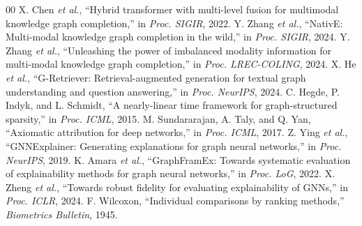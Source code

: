 \begin{thebibliography}{00}
 X. Chen \textit{et al.}, ``Hybrid transformer with multi-level fusion for multimodal knowledge graph completion,'' in \textit{Proc. SIGIR}, 2022.
 Y. Zhang \textit{et al.}, ``NativE: Multi-modal knowledge graph completion in the wild,'' in \textit{Proc. SIGIR}, 2024.
 Y. Zhang \textit{et al.}, ``Unleashing the power of imbalanced modality information for multi-modal knowledge graph completion,'' in \textit{Proc. LREC-COLING}, 2024.
 X. He \textit{et al.}, ``G-Retriever: Retrieval-augmented generation for textual graph understanding and question answering,'' in \textit{Proc. NeurIPS}, 2024.
 C. Hegde, P. Indyk, and L. Schmidt, ``A nearly-linear time framework for graph-structured sparsity,'' in \textit{Proc. ICML}, 2015.
 M. Sundararajan, A. Taly, and Q. Yan, ``Axiomatic attribution for deep networks,'' in \textit{Proc. ICML}, 2017.
 Z. Ying \textit{et al.}, ``GNNExplainer: Generating explanations for graph neural networks,'' in \textit{Proc. NeurIPS}, 2019.
 K. Amara \textit{et al.}, ``GraphFramEx: Towards systematic evaluation of explainability methods for graph neural networks,'' in \textit{Proc. LoG}, 2022.
 X. Zheng \textit{et al.}, ``Towards robust fidelity for evaluating explainability of GNNs,'' in \textit{Proc. ICLR}, 2024.
 F. Wilcoxon, ``Individual comparisons by ranking methods,'' \textit{Biometrics Bulletin}, 1945.
\end{thebibliography}
